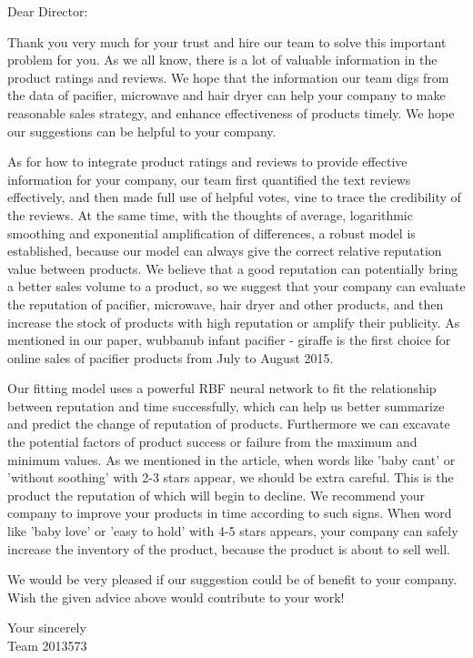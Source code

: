 \documentclass{mcmthesis}
\begin{document}
\begin{memo}
\noindent Dear Director:

Thank you very much for your trust and hire our team to solve this important problem for you. As we all know, there is a lot of valuable information in the product ratings and reviews. We hope that the information our team digs from the data of pacifier, microwave and hair dryer can help your company to make reasonable sales strategy, and enhance effectiveness of products timely. We hope our suggestions can be helpful to your company. 

%
As for how to integrate product ratings and reviews to provide effective information for your company, our team first quantified the text reviews effectively, and then made full use of helpful votes, vine to trace the credibility of the reviews. At the same time, with the thoughts of average, logarithmic smoothing and exponential amplification of differences, a robust model is established, because our model can always give the correct relative reputation value between products. We believe that a good reputation can potentially bring a better sales volume to a product, so we suggest that your company can evaluate the reputation of pacifier, microwave, hair dryer and other products, and then increase the stock of products with high reputation or amplify their publicity. As mentioned in our paper, wubbanub infant pacifier - giraffe is the first choice for online sales of pacifier products from July to August 2015.

Our fitting model uses a powerful RBF neural network to fit the relationship between reputation and time successfully, which can help us better summarize and predict the change of reputation of products. Furthermore we can excavate the potential factors of product success or failure from the maximum and minimum values. As we mentioned in the article, when words like 'baby cant' or 'without soothing' with 2-3 stars appear, we should be extra careful. This is the product the reputation of which  will begin to decline. We recommend your company to improve your products in time according to such signs. When word like 'baby love' or 'easy to hold' with 4-5 stars appears, your company can safely increase the inventory of the product, because the product is about to sell well.
%
%
%

We would be very pleased if our suggestion could be of benefit to your company. Wish the given advice above would contribute to your work! 

\begin{flushright}
	Your sincerely\\
	 Team 2013573
\end{flushright}

\thispagestyle{empty}

\end{memo}
\end{document}
